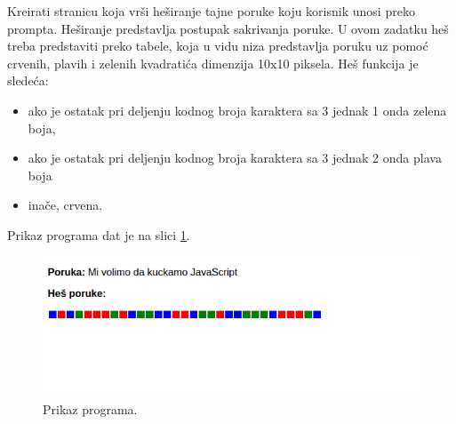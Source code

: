 \begin{primer}
Kreirati stranicu koja vrši heširanje tajne poruke koju korisnik unosi preko prompta. Heširanje predstavlja postupak sakrivanja poruke. U ovom zadatku heš treba predstaviti preko tabele, koja u vidu niza predstavlja poruku uz pomoć crvenih, plavih i zelenih kvadratića dimenzija 10x10 piksela. Heš funkcija je sledeća:
\begin{itemize}
\item ako je ostatak pri deljenju kodnog broja karaktera sa 3 jednak 1 onda zelena boja,
\item ako je ostatak pri deljenju kodnog broja karaktera sa 3 jednak 2 onda plava boja
\item inače, crvena. 
\end{itemize}
Prikaz programa dat je na slici \ref{fig:hes}.
\begin{figure}[h!]
\begin{center}
\includegraphics[scale=0.5]{../pictures/hes.png}
\end{center}
\caption{Prikaz programa.}
\label{fig:hes}
\end{figure}

\end{primer}
\newpage

